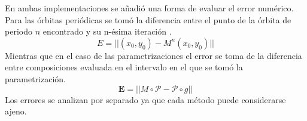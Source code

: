 En ambas implementaciones se añadi\'o una forma de evaluar el error num\'erico. Para las \'orbitas peri\'odicas se tom\'o la diferencia entre el punto de la \'orbita de periodo $n$ encontrado y su n-\'esima iteraci\'on .
\begin{equation}
	E = ||(x_{0},y_{0})-M^{n}(x_{0},y_{0})||
\end{equation}
Mientras que en el caso de las parametrizaciones el error se toma de la diferencia entre composiciones evaluada en el intervalo en el que se tom\'o la parametrizaci\'on. 
\begin{equation}
	\mathbf{E} = || M\circ \mathcal{P}- \mathcal{P}\circ g||
\end{equation}
Los errores se analizan por separado ya que cada m\'etodo puede considerarse ajeno. 






